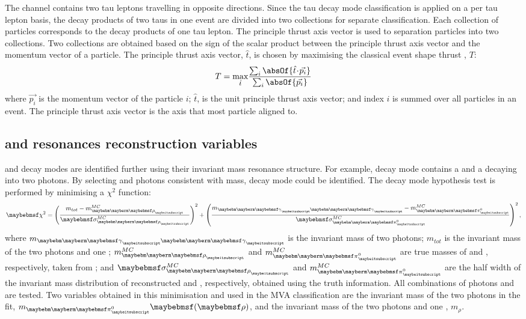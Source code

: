 The \eeToTauTau channel contains two tau leptons travelling in opposite directions. Since the tau decay mode classification is applied on a per tau lepton basis, the decay products of two taus in one event are divided into two collections for separate classification. Each collection of particles corresponds  to the decay products of one tau lepton.
The principle thrust axis vector is used to separation particles into two collections. Two collections are obtained based on the sign of the scalar product between the principle thrust axis vector  and the momentum vector of a particle. The principle thrust axis vector, $\hat{t}$, is chosen by maximising the classical event shape thrust \cite{PhysRevLett.39.1587}, $T$:
\begin{equation}
T = \max_{\hat{t}}\!\frac{\sum_{i}\absOf{\hat{t}\!\cdot\!\vec{p_{i}}}}{\sum_{i}\absOf{\vec{p_{i}}}}
\end{equation}
where $\vec{p_{i}}$ is the momentum vector of the particle $i$;   $\hat{t}$, is the unit principle thrust axis vector; and index $i$ is summed over all particles in an event. The principle thrust axis vector is the axis that most particle aligned to.




\subsection{\texorpdfstring{\decayRhoShort and \decayAiPhotonShort} \, resonances reconstruction variables}
\label{sec:tauResonance}
\decayRhoShort and \decayAiPhotonShort decay modes are identified further using their invariant mass resonance structure. For example, \decayRhoShort decay mode contains a \Pgpm and a \Ppizero decaying into two photons. By selecting \Pgpm and photons consistent with \Prho mass, \decayRhoShort decay mode could be identified. The  \decayRhoShort decay mode hypothesis test is performed by minimising a  $\chi^{2}$ function:
\begin{equation}
\chi^{2} = {\left(\frac{m_{tot} -  m^{MC}_{\Prho}}{\sigma^{MC}_{\Prho}}\right)}^{2} + {\left(\frac{m_{\Pphoton \Pphoton} -  m^{MC}_{\Ppizero}}{\sigma^{MC}_{\Ppizero}}\right)}^{2} \,,
\label{eqn:tauRho}
\end{equation}
where $m_{\Pphoton \Pphoton}$ is the invariant mass of two photons; $m_{tot}$ is the invariant mass of the  two photons and one \Pgpm; $m^{MC}_{\Prho}$ and $m^{MC}_{\Ppizero}$ are true masses of \Prho and \Ppizero, respectively, taken from \cite{Agashe:2014kda}; and $\sigma^{MC}_{\Prho}$ and $m^{MC}_{\Ppizero}$ are the half width of the invariant mass distribution of reconstructed \Prho and \Ppizero, respectively, obtained using the truth information. All combinations of photons and \Pgpm are tested. Two variables obtained in this minimisation and used in the MVA classification are the invariant mass of the two photons in the fit, $m_{\Pgpz}\parenths{\rho}$, and  the invariant mass of the  two photons and one \Pgpm, $m_\rho$.



